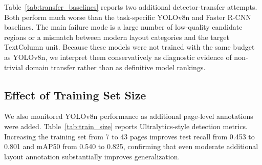 \documentclass[12pt]{article}
\begin{document}
Table~\ref{tab:transfer_baselines} reports two additional detector-transfer attempts. Both perform much worse than the task-specific YOLOv8n and Faster R-CNN baselines. The main failure mode is a large number of low-quality candidate regions or a mismatch between modern layout categories and the target TextColumn unit. Because these models were not trained with the same budget as YOLOv8n, we interpret them conservatively as diagnostic evidence of non-trivial domain transfer rather than as definitive model rankings.


\begin{table}[t]
\centering
\caption{Supplementary strict-localization comparison at IoU@0.75. Compared with Table~\ref{tab:main_results}, the stricter threshold penalizes boundary errors more heavily.}
\label{tab:iou75}
\end{table}


\begin{table}[t]
\centering
\caption{Page-level bootstrap 95\% confidence intervals on the 11-page test split.}
\label{tab:bootstrap_ci}
\end{table}


\subsection{Effect of Training Set Size}
We also monitored YOLOv8n performance as additional page-level annotations were added. Table~\ref{tab:train_size} reports Ultralytics-style detection metrics. Increasing the training set from 7 to 43 pages improves test recall from 0.453 to 0.801 and mAP50 from 0.540 to 0.825, confirming that even moderate additional layout annotation substantially improves generalization.
\end{document}
